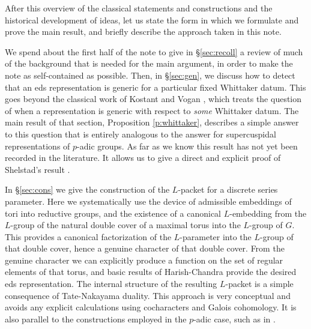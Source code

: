 \documentclass{article}
\theoremstyle{definition}
\numberwithin{equation}{section}
\renewcommand{\-}{\hyp{}}
\begin{document}
After this overview of the classical statements and constructions and the historical development of ideas, let us state the form in which we formulate and prove the main result, and briefly describe the approach taken in this note. 

We spend about the first half of the note to give in \S\ref{sec:recoll} a review of much of the background that is needed for the main argument, in order to make the note as self-contained as possible. Then, in \S\ref{sec:gen}, we discuss how to detect that an eds representation is generic for a particular fixed Whittaker datum. This goes beyond the classical work of Kostant \cite{Kos78} and Vogan \cite{Vog78}, which treats the question of when a representation is generic with respect to \emph{some} Whittaker datum. The main result of that section, Proposition \ref{p:whittaker}, describes a simple answer to this question that is entirely analogous to the answer for supercuspidal representations of $p$-adic groups. As far as we know this result has not yet been recorded in the literature. It allows us to give a direct and explicit proof of Shelstad's result \cite[Theorem 11.5]{SheTE3}.

In \S\ref{sec:cons} we give the construction of the $L$\-packet for a discrete series parameter. Here we systematically use the device of admissible embeddings of tori into reductive groups, and the existence of a canonical $L$\-embedding from the $L$\-group of the natural double cover of a maximal torus into the $L$\-group of $G$. This provides a canonical factorization of the $L$\-parameter into the $L$\-group of that double cover, hence a genuine character of that double cover. From the genuine character we can explicitly produce a function on the set of regular elements of that torus, and basic results of Harish-Chandra provide the desired eds representation. The internal structure of the resulting $L$\-packet is a simple consequence of Tate-Nakayama duality. This approach is very conceptual and avoids any explicit calculations using cocharacters and Galois cohomology. It is also parallel to the constructions employed in the $p$-adic case, such as in \cite{KalRSP}.
\end{document}
